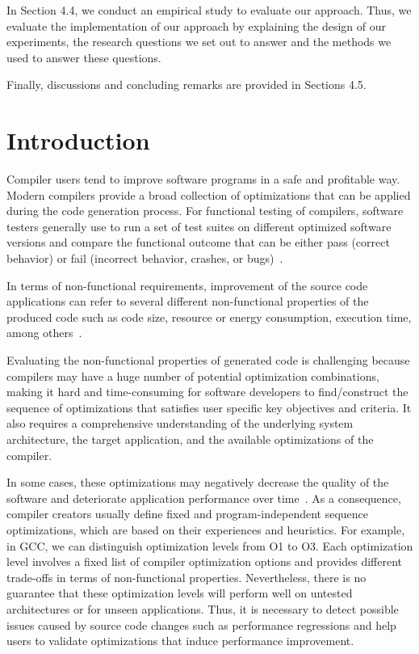 In Section 4.4, we conduct an empirical study to evaluate our approach. Thus, we evaluate the implementation of our approach by explaining the design of our experiments, the research questions we set out to answer and the methods we used to answer these questions.

Finally, discussions and concluding remarks are provided in Sections 4.5\@.
	


\section{Introduction}
Compiler users tend to improve software programs in a safe and profitable way. Modern compilers provide a broad collection of optimizations that can be applied during the code generation process. 
For functional testing of compilers, software testers generally use to run a set of test suites on different optimized software versions and compare the functional outcome that can be either pass (correct behavior) or fail (incorrect behavior, crashes, or bugs)~\cite{chen2016empirical,hoste2008cole,le2014compiler}.

In terms of non-functional requirements, improvement of the source code applications can refer to several different non-functional properties of the produced code such as code size, resource or energy consumption, execution time, among others~\cite{almagor2004finding,pan2006fast}.

Evaluating the non-functional properties of generated code is challenging because compilers may have a huge number of potential optimization combinations, making it hard and time-consuming for software developers to find/construct the sequence of optimizations that satisfies user specific key objectives and criteria. It also requires a comprehensive understanding of the underlying system architecture, the target application, and the available optimizations of the compiler.

In some cases, these optimizations may negatively decrease the quality of the software and deteriorate application performance over time~\cite{molyneaux2009art}. 
As a consequence, compiler creators usually define fixed and program-independent sequence optimizations, which are based on their experiences and heuristics. For example, in GCC, we can distinguish optimization levels from O1 to O3. Each optimization level involves a fixed list of compiler optimization options and provides different trade-offs in terms of non-functional properties.
Nevertheless, there is no guarantee that these optimization levels will perform well on untested architectures or for unseen applications. 
Thus, it is necessary to detect possible issues caused by source code changes such as performance regressions and help users to validate optimizations that induce performance improvement.


